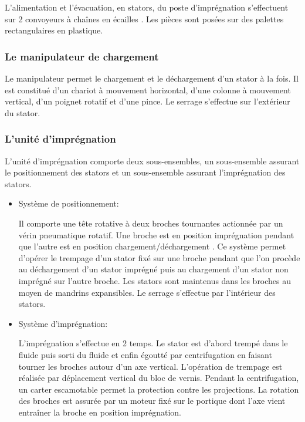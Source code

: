 L'alimentation et l'évacuation, en stators, du poste d'imprégnation s'effectuent sur 2 convoyeurs à chaînes \og en écailles \fg. Les pièces sont posées sur des palettes rectangulaires en plastique.

\subsubsection{Le manipulateur de chargement}
Le manipulateur permet le chargement et le déchargement d'un stator à la fois. Il est constitué d'un chariot à mouvement horizontal, d'une colonne à mouvement vertical, d'un poignet rotatif et d'une pince. Le serrage s'effectue sur l'extérieur du stator.

\subsubsection{L'unité d'imprégnation}
L'unité d'imprégnation comporte deux sous-ensembles, un sous-ensemble assurant le positionnement des stators et un sous-ensemble assurant l'imprégnation des stators.

\begin{itemize}
 \item Système de positionnement:
 
Il comporte une tête rotative à deux broches tournantes actionnée par un vérin pneumatique rotatif. Une broche est en position \og imprégnation \fg pendant que l'autre est en position \og chargement/déchargement \fg. Ce système permet d'opérer le trempage d'un stator fixé sur une broche pendant que l'on procède au déchargement d'un stator imprégné puis au chargement d'un stator non imprégné sur l'autre broche.
Les stators sont maintenus dans les broches au moyen de mandrins expansibles. Le serrage s'effectue par l'intérieur des stators.
 
 \item Système d'imprégnation:
  
L'imprégnation s'effectue en 2 temps. Le stator est d'abord trempé dans le fluide puis sorti du fluide et enfin \og égoutté \fg par centrifugation en faisant tourner les broches autour d'un axe vertical.
L'opération de trempage est réalisée par déplacement vertical du bloc de vernis.
Pendant la centrifugation, un carter escamotable permet la protection contre les projections. La rotation des broches est assurée par un moteur fixé sur le portique dont l'axe vient entraîner la broche en position imprégnation.
\end{itemize}

